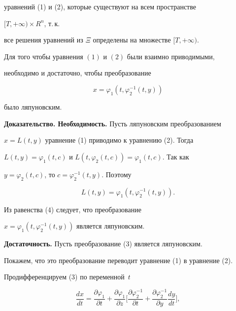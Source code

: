 уравнений (1) и (2), которые существуют на всем пространстве 


$[T,+\infty)\times R^n$, т.\,к. 


все решения уравнений из $\Xi$ определены на множестве $[T,+\infty)$. 


 


\begin{thm} 


Для того чтобы уравнения $(1)$ и $(2)$ были взаимно приводимыми, 


необходимо и достаточно, чтобы преобразование 


\begin{equation} 


x=\varphi_1(t,\varphi^{-1}_2(t,y)) 


\end{equation} 


было ляпуновским. 


\end{thm} 


 


{\bf Доказательство. Необходимость.} Пусть ляпуновским преобразованием 


$x=L(t,y)$ уравнение (1) приводимо к уравнению (2). Тогда 


$L(t,y)=\varphi_1(t,c)$ и $L(t,\varphi_2(t,c))=\varphi_1(t,c)$. Так как 


$y=\varphi_2(t,c)$, то $c=\varphi^{-1}_2(t,y)$. Поэтому 


\begin{equation} 


L(t,y)=\varphi_1(t,\varphi^{-1}_2(t,y)). 


\end{equation} 


Из равенства (4) следует, что преобразование 


$x=\varphi_1(t,\varphi^{-1}_2(t,y))$ является ляпуновским. 


\medskip 


 


{\bf Достаточность.} Пусть преобразование (3) является ляпуновским. 


Покажем, что это преобразование переводит уравнение (1) в уравнение (2). 


Продифференцируем (3) по переменной~$t$ 


\begin{equation} 


\frac{dx}{dt}=\frac{\partial\varphi_1}{\partial t}+ 


\frac{\partial\varphi_1}{\partial z}\biggl[ 


\frac{\partial\varphi^{-1}_2}{\partial t}+ 


\frac{\partial\varphi^{-1}_2}{\partial y}\frac{dy}{dt}\biggr], 


\end{equation} 


